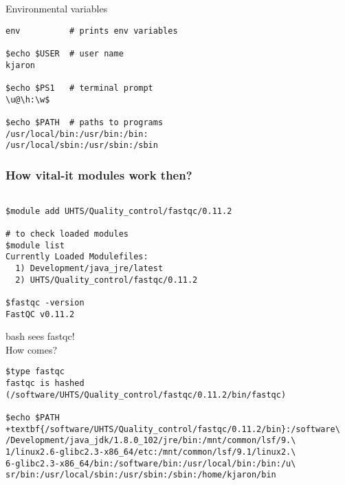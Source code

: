 \documentclass[xcolor=dvipsnames]{beamer}
\begin{document}
\begin{frame}[fragile]
	\begin{center}
		\huge
		Environmental variables \\
	\end{center}

\Large
\begin{Verbatim}
env          # prints env variables

$echo $USER  # user name
kjaron

$echo $PS1   # terminal prompt
\u@\h:\w$

$echo $PATH  # paths to programs
/usr/local/bin:/usr/bin:/bin:
/usr/local/sbin:/usr/sbin:/sbin
\end{Verbatim}
\end{frame}

\begin{frame}[fragile]
\frametitle{How vital-it modules work then?}
\large
\begin{verbatim}

$module add UHTS/Quality_control/fastqc/0.11.2

# to check loaded modules
$module list
Currently Loaded Modulefiles:
  1) Development/java_jre/latest
  2) UHTS/Quality_control/fastqc/0.11.2

$fastqc -version
FastQC v0.11.2
\end{verbatim}
\end{frame}

\begin{frame}
	\begin{center}
		\Huge
		bash sees fastqc!\\
		\vspace{1cm}
		\Large
		How comes?
	\end{center}
\end{frame}

\begin{frame}[fragile]
\footnotesize
\begin{Verbatim}[commandchars=\+\{\}]
$type fastqc
fastqc is hashed
(/software/UHTS/Quality_control/fastqc/0.11.2/bin/fastqc)

$echo $PATH
+textbf{/software/UHTS/Quality_control/fastqc/0.11.2/bin}:/software\
/Development/java_jdk/1.8.0_102/jre/bin:/mnt/common/lsf/9.\
1/linux2.6-glibc2.3-x86_64/etc:/mnt/common/lsf/9.1/linux2.\
6-glibc2.3-x86_64/bin:/software/bin:/usr/local/bin:/bin:/u\
sr/bin:/usr/local/sbin:/usr/sbin:/sbin:/home/kjaron/bin
\end{Verbatim}
\end{frame}
\end{document}
